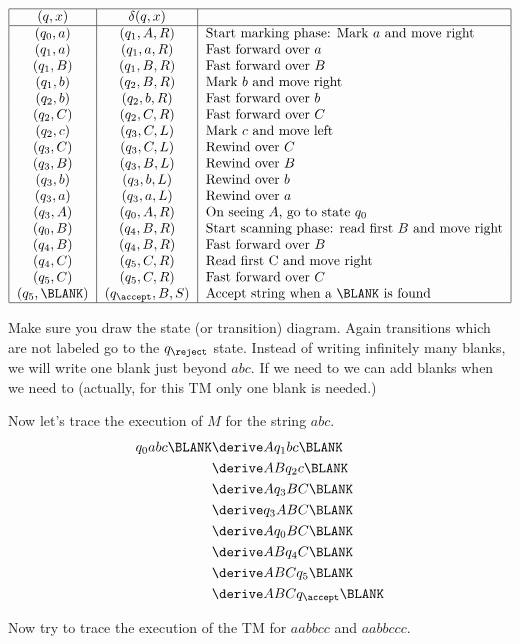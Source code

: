\begin{eg}
\[
\begin{tabular}{|c|c|l|}
  \hline
  $(q,x)$ & $\delta(q,x)$ & \mbox{} \\
  \hline
  $(q_0,a)$ & $(q_1,A,R)$ & Start marking phase: Mark $a$ and move right \\
  $(q_1,a)$ & $(q_1,a,R)$ & Fast forward over $a$ \\
  $(q_1,B)$ & $(q_1,B,R)$ & Fast forward over $B$ \\
  $(q_1,b)$ & $(q_2,B,R)$ & Mark $b$ and move right \\
  $(q_2,b)$ & $(q_2,b,R)$ & Fast forward over $b$ \\
  $(q_2,C)$ & $(q_2,C,R)$ & Fast forward over $C$ \\
  $(q_2,c)$ & $(q_3,C,L)$ & Mark $c$ and move left \\
  $(q_3,C)$ & $(q_3,C,L)$ & Rewind over $C$ \\
  $(q_3,B)$ & $(q_3,B,L)$ & Rewind over $B$ \\
  $(q_3,b)$ & $(q_3,b,L)$ & Rewind over $b$ \\
  $(q_3,a)$ & $(q_3,a,L)$ & Rewind over $a$ \\
  $(q_3,A)$ & $(q_0,A,R)$ & On seeing $A$, go to state $q_0$\\
  $(q_0,B)$ & $(q_4,B,R)$ & Start scanning phase: read first $B$ and move right\\
  $(q_4,B)$ & $(q_4,B,R)$ & Fast forward over $B$ \\
  $(q_4,C)$ & $(q_5,C,R)$ & Read first C and move right\\
  $(q_5,C)$ & $(q_5,C,R)$ & Fast forward over $C$\\
  $(q_5,\BLANK)$ & $(q_{\accept},B,S)$ & Accept string when a $\BLANK$ is found\\
  \hline
\end{tabular}
\]

Make sure you draw the state (or transition) diagram. Again
transitions which are not labeled go to the $q_{\reject}$ state.
Instead of writing infinitely many blanks, we will write one blank
just beyond $abc$. If we need to we can add blanks when we need to
(actually, for this TM only one blank is needed.)

Now let's trace the execution of $M$ for the string $abc$.
\begin{align*}
q_0 abc\BLANK
 &\derive Aq_1bc\BLANK \\
 &\derive ABq_2c\BLANK \\
 &\derive Aq_3BC\BLANK \\
 &\derive q_3ABC\BLANK \\
 &\derive Aq_0BC\BLANK \\
 &\derive ABq_4C\BLANK \\
 &\derive ABCq_5\BLANK \\
 &\derive ABCq_{\accept}\BLANK \\
\end{align*}

Now try to trace the execution of the TM for $aabbcc$ and
$aabbccc$.
\end{eg}

